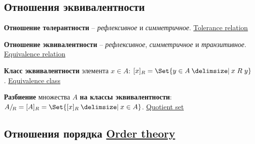 \documentclass[a4paper,10pt]{article}
\begin{document}
\subsection{Отношения эквивалентности}

\begin{terms}
    \item \textbf{Отношение толерантности} \--- \textit{рефлексивное} и \textit{симметричное}.
    \hfill\href{https://en.wikipedia.org/wiki/Tolerance_relation}{Tolerance relation}

    \item \textbf{Отношение эквивалентности} \--- \textit{рефлексивное}, \textit{симметричное} и \textit{транзитивное}.
    \hfill\href{https://en.wikipedia.org/wiki/Equivalence_relation}{Equivalence relation}

    \item \textbf{Класс эквивалентности} элемента $x \in A$: $\equivclass{x} = \Set{y \in A \given x \rel y}$.
    \hfill\href{https://en.wikipedia.org/wiki/Equivalence_class}{Equivalence class}

    \item \textbf{Разбиение} множества $A$ \textbf{на классы эквивалентности}: $\quotient[R]{A} = \equivclass{A} = \Set{\equivclass{x} \given x \in A}$.
    \hfill\href{https://en.wikipedia.org/wiki/Quotient_set}{Quotient set}
\end{terms}


\subsection{Отношения порядка%
\texorpdfstring{\hfill\normalfont\href{https://en.wikipedia.org/wiki/Order_theory}{Order theory}}{}}
\end{document}
